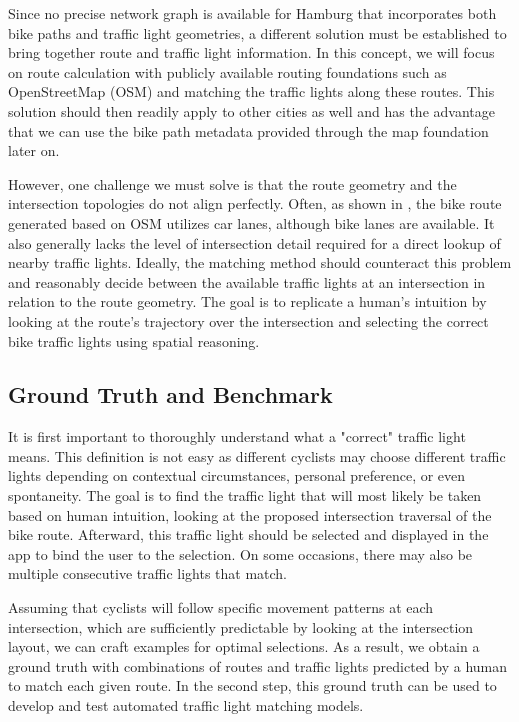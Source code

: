 Since no precise network graph is available for Hamburg that incorporates both bike paths and traffic light geometries, a different solution must be established to bring together route and traffic light information. In this concept, we will focus on route calculation with publicly available routing foundations such as OpenStreetMap (OSM) and matching the traffic lights along these routes. This solution should then readily apply to other cities as well and has the advantage that we can use the bike path metadata provided through the map foundation later on.

However, one challenge we must solve is that the route geometry and the intersection topologies do not align perfectly. Often, as shown in , the bike route generated based on OSM utilizes car lanes, although bike lanes are available. It also generally lacks the level of intersection detail required for a direct lookup of nearby traffic lights. Ideally, the matching method should counteract this problem and reasonably decide between the available traffic lights at an intersection in relation to the route geometry. The goal is to replicate a human's intuition by looking at the route's trajectory over the intersection and selecting the correct bike traffic lights using spatial reasoning.

\subsection{Ground Truth and Benchmark}

It is first important to thoroughly understand what a "correct" traffic light means. This definition is not easy as different cyclists may choose different traffic lights depending on contextual circumstances, personal preference, or even spontaneity. The goal is to find the traffic light that will most likely be taken based on human intuition, looking at the proposed intersection traversal of the bike route. Afterward, this traffic light should be selected and displayed in the app to bind the user to the selection. On some occasions, there may also be multiple consecutive traffic lights that match.

Assuming that cyclists will follow specific movement patterns at each intersection, which are sufficiently predictable by looking at the intersection layout, we can craft examples for optimal selections. As a result, we obtain a ground truth with combinations of routes and traffic lights predicted by a human to match each given route. In the second step, this ground truth can be used to develop and test automated traffic light matching models.


